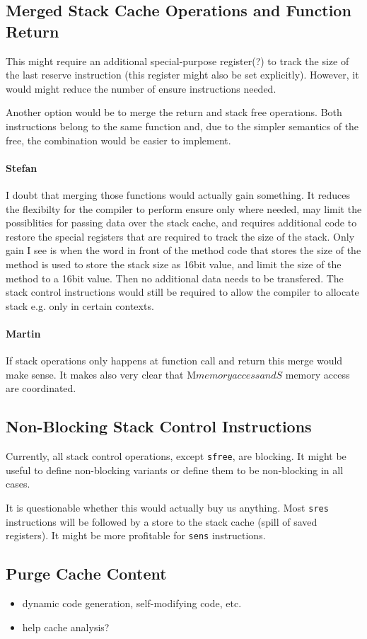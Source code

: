 \documentclass{IEEEtran}
\newcommand{\comment}[3]{\paragraph*{\textbf{#1}}{\color{#3}#2}}
\newcommand{\martin}[1]{\comment{Martin}{#1}{Blue}}
\newcommand{\stefan}[1]{\comment{Stefan}{#1}{RoyalPurple}}
\begin{document}
\subsection{Merged Stack Cache Operations and Function Return}

This might require an additional special-purpose register(?) to track the size
of the last reserve instruction (this register might also be set explicitly).
However, it would might reduce the number of ensure instructions needed.

Another option would be to merge the return and stack free operations. Both
instructions belong to the same function and, due to the simpler semantics of
the free, the combination would be easier to implement.

\stefan{I doubt that merging those functions would actually gain something. It reduces the flexibilty for the compiler to perform ensure
only where needed, may limit the possiblities for passing data over the stack cache, and requires additional
code to restore the special registers that are required to track the size of the stack. Only gain I see is when the word in front of the 
method code that stores the size of the method is used to store the stack size as 16bit value, and limit the size of the method to a 16bit
value. Then no additional data needs to be transfered. The stack control instructions would still be required to allow the compiler to
allocate stack e.g. only in certain contexts.}

\martin{If stack operations only happens at function call
and return this merge would make sense. It makes also
very clear that M$ memory access and S$ memory access are coordinated.}

\subsection{Non-Blocking Stack Control Instructions}

Currently, all stack control operations, except \texttt{sfree}, are blocking. It
might be useful to define non-blocking variants or define them to be
non-blocking in all cases.

It is questionable whether this would actually buy us anything. Most
\texttt{sres} instructions will be followed by a store to the stack cache
(spill of saved registers). It might be more profitable for \texttt{sens}
instructions.

\subsection{Purge Cache Content}
\begin{itemize}
  \item dynamic code generation, self-modifying code, etc.
  \item help cache analysis?
\end{itemize}
\end{document}
